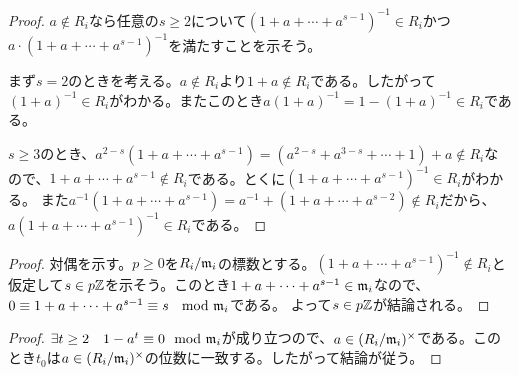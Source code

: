 \begin{proof}
  $a \notin R_i$なら任意の$s \geq 2$について$(1 + a + \cdots + a^{s-1})^{-1} \in R_i$かつ$a \cdot (1 + a + \cdots + a^{s-1})^{-1}$を満たすことを示そう。

  まず$s=2$のときを考える。$a \notin R_i$より$1 + a \notin R_i$である。したがって$(1+a)^{-1} \in R_i$がわかる。またこのとき$a(1+a)^{-1} = 1 - (1+a)^{-1} \in R_i$である。

$s \geq 3$のとき、$a^{2-s}(1 + a + \cdots + a^{s-1}) = (a^{2-s} + a^{3-s} +  \cdots + 1) + a \notin R_i$なので、$1 + a + \cdots + a^{s-1} \not\in R_i$である。とくに$(1 + a + \cdots + a^{s-1})^{-1} \in R_i$がわかる。
また$a^{-1}(1 + a + \cdots + a^{s-1}) = a^{-1} + (1 + a + \cdots + a^{s-2}) \not\in R_i$だから、$a(1 + a + \cdots + a^{s-1})^{-1} \in R_i$である。
\end{proof}



\begin{proof}
  対偶を示す。$p \geq 0$を$R_i / \mathfrak{m}_i$の標数とする。$(1 + a + \cdots + a^{s-1})^{-1} \notin R_i$と仮定して$s \in p{\mathbb Z}$を示そう。このとき$1 + a + \cdots + a^{s-1} \in \mathfrak{m}_i$なので、$0 \equiv 1 + a + \cdots + a^{s-1} \equiv s \; \mod {\mathfrak{m}}_i$である。
  よって$s \in p{\mathbb Z}$が結論される。
\end{proof}


\begin{proof}
  $\exists t \geq 2  \quad 1 - a^t \equiv 0  \mod {\mathfrak{m}}_i$が成り立つので、$a \in (R_i/\mathfrak{m}_i)^{\times}$である。このとき$t_0$は$a \in (R_i/\mathfrak{m}_i)^{\times}$の位数に一致する。したがって結論が従う。
\end{proof}


